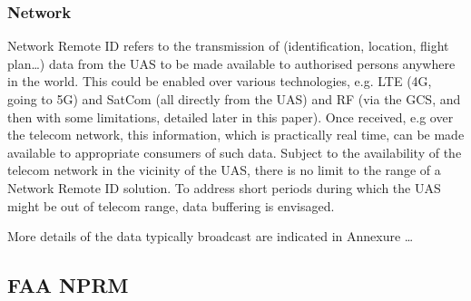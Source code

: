 \documentclass{ua_wgs_base}
\begin{document}
\subsubsection{Network}

Network Remote ID refers to the transmission of (identification, location,
flight plan\dots ) data from the UAS to be made available to authorised
persons anywhere in the world. This could be enabled over various
technologies, e.g. LTE (4G, going to 5G) and SatCom (all directly
from the UAS) and RF (via the GCS, and then with some limitations,
detailed later in this paper). Once received, e.g over the telecom
network, this information, which is practically real time, can be
made available to appropriate consumers of such data. Subject to the
availability of the telecom network in the vicinity of the UAS, there
is no limit to the range of a Network Remote ID solution. To address
short periods during which the UAS might be out of telecom range,
data buffering is envisaged.

More details of the data typically broadcast are indicated in Annexure
\dots{}

\subsection{FAA NPRM}
\end{document}
